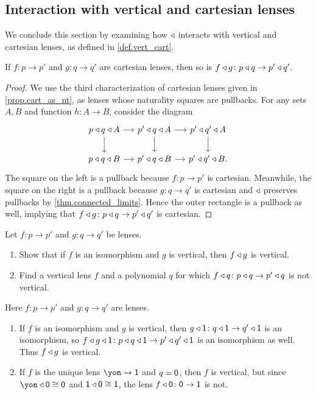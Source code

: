 \documentclass[Book-Poly]{subfiles}
\begin{document}
\subsection{Interaction with vertical and cartesian lenses} \label{subsec.comon.comp.prop.cart}

We conclude this section by examining how $\mathbin{\triangleleft}$ interacts with vertical and cartesian lenses, as defined in \cref{def.vert_cart}.

\begin{proposition}\label{prop.comp_pres_cart}
If $f\colon p\to p'$ and $g\colon q\to q'$ are cartesian lenses, then so is $f\mathbin{\triangleleft} g\colon p\mathbin{\triangleleft} q \to p'\mathbin{\triangleleft} q'$.
\end{proposition}
\begin{proof}
We use the third characterization of cartesian lenses given in \cref{prop.cart_as_nt}, as lenses whose naturality squares are pullbacks.
For any sets $A,B$ and function $h\colon A\to B$, consider the diagram
\[
\begin{tikzcd}[column sep=small]
    p\tri q\tri A\ar[r]\ar[d] & p'\tri q\tri A\ar[r]\ar[d] & p'\tri q'\tri A\ar[d] \\
    p\tri q\tri B\ar[r] & p'\tri q\tri B\ar[r] & p'\tri q'\tri B.
\end{tikzcd}
\]
The square on the left is a pullback because $f\colon p\to p'$ is cartesian.
Meanwhile, the square on the right is a pullback because $g\colon q\to q'$ is cartesian and $\mathbin{\triangleleft}$ preserves pullbacks by \cref{thm.connected_limits}.
Hence the outer rectangle is a pullback as well, implying that $f\mathbin{\triangleleft} g\colon p\mathbin{\triangleleft} q \to p'\mathbin{\triangleleft} q'$ is cartesian.
\end{proof}

\begin{exercise}
Let $f\colon p\to p'$ and $g\colon q\to q'$ be lenses.
\begin{enumerate}
	\item Show that if $f$ is an isomorphism and $g$ is vertical, then $f\mathbin{\triangleleft} g$ is vertical.
	\item Find a vertical lens $f$ and a polynomial $q$ for which $f\mathbin{\triangleleft} q\colon p\mathbin{\triangleleft} q\to p'\mathbin{\triangleleft} q$ is not vertical.
\qedhere
\end{enumerate}
\begin{solution}
Here $f\colon p\to p'$ and $g\colon q\to q'$ are lenses.
\begin{enumerate}
    \item If $f$ is an isomorphism and $g$ is vertical, then $g\mathbin{\triangleleft}\textsf{1}\colon q\mathbin{\triangleleft}\textsf{1}\to q'\mathbin{\triangleleft}\textsf{1}$ is an isomorphism, so $f\mathbin{\triangleleft} g\mathbin{\triangleleft}\textsf{1}\colon p\mathbin{\triangleleft} q\mathbin{\triangleleft}\textsf{1}\to p'\mathbin{\triangleleft} q'\mathbin{\triangleleft}\textsf{1}$ is an isomorphism as well.
    Thus $f\mathbin{\triangleleft} g$ is vertical.
    \item If $f$ is the unique lens $\yon\to\1$ and $q=\textsf{0}$, then $f$ is vertical, but since $\yon\tri\0\iso\0$ and $\textsf{1}\mathbin{\triangleleft}\textsf{0}\cong\textsf{1}$, the lens $f\mathbin{\triangleleft}\textsf{0}\colon\textsf{0}\to\textsf{1}$ is not.
\end{enumerate}
\end{solution}
\end{exercise}
\end{document}

